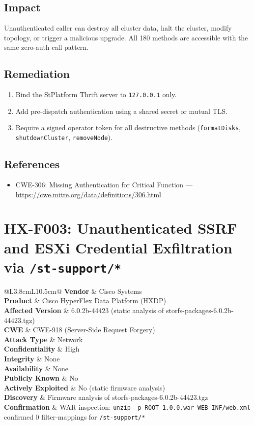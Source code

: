 \documentclass[11pt,a4paper]{article}
\makeatletter
\newcommand{\findingmeta}[9]{%
\begin{tabular}{@{}L{3.8cm}L{10.5cm}@{}}
\textbf{Vendor}             & Cisco Systems \\
\textbf{Product}            & Cisco HyperFlex Data Platform (HXDP) \\
\textbf{Affected Version}   & 6.0.2b-44423 (static analysis of storfs-packages-6.0.2b-44423.tgz) \\
\textbf{CWE}                & #1 \\
\textbf{Attack Type}        & #2 \\
\textbf{Confidentiality}    & #3 \\
\textbf{Integrity}          & #4 \\
\textbf{Availability}       & #5 \\
\textbf{Publicly Known}     & #6 \\
\textbf{Actively Exploited} & #7 \\
\textbf{Discovery}          & #8 \\
\textbf{Confirmation}       & #9 \\
\end{tabular}%
}
\makeatother
\begin{document}
\subsection*{Impact}

Unauthenticated caller can destroy all cluster data, halt the cluster, modify
topology, or trigger a malicious upgrade. All 180 methods are accessible with
the same zero-auth call pattern.

\subsection*{Remediation}

\begin{enumerate}[noitemsep]
\item Bind the StPlatform Thrift server to \texttt{127.0.0.1} only.
\item Add pre-dispatch authentication using a shared secret or mutual TLS.
\item Require a signed operator token for all destructive methods
  (\texttt{formatDisks}, \texttt{shutdownCluster}, \texttt{removeNode}).
\end{enumerate}

\subsection*{References}

\begin{itemize}[noitemsep]
\item CWE-306: Missing Authentication for Critical Function ---
  \url{https://cwe.mitre.org/data/definitions/306.html}
\end{itemize}

\bigskip

\section{HX-F003: Unauthenticated SSRF and ESXi Credential Exfiltration via \texttt{/st-support/*}}

\findingmeta{CWE-918 (Server-Side Request Forgery)}{Network}{High}{None}{None}{No}{No (static firmware analysis)}{Firmware analysis of storfs-packages-6.0.2b-44423.tgz}{WAR inspection: \texttt{unzip -p ROOT-1.0.0.war WEB-INF/web.xml} confirmed 0 filter-mappings for \texttt{/st-support/*}}
\end{document}
